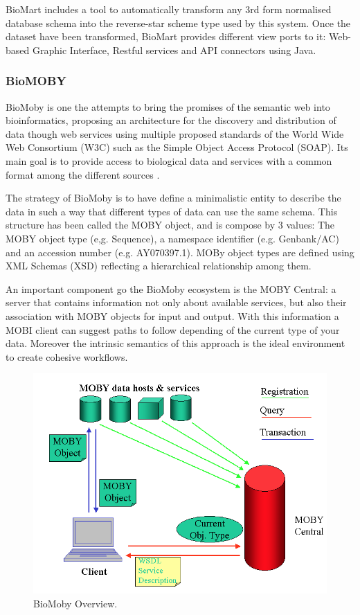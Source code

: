 BioMart includes a tool to automatically transform any 3rd form normalised database schema into the reverse-star scheme type used by this system. Once the dataset have been transformed, BioMart provides different view ports to it: Web-based Graphic Interface, Restful services and API connectors using Java.

\subsubsection{BioMOBY}
BioMoby is one the attempts to bring the promises of the semantic web into bioinformatics, proposing an architecture for the discovery and distribution of data though web services using multiple proposed standards of the World Wide Web Consortium (W3C) such as the Simple Object Access Protocol (SOAP). Its main goal is to provide access to biological data and services with a common format among the different sources \cite{WIL2002}.

The strategy of BioMoby is to have define a minimalistic entity to describe the data in such a way that different types of data can use the same schema.
This structure has been called the MOBY object, and is compose by 3 values: The MOBY object type (e,g. Sequence), a namespace identifier (e.g. Genbank/AC) and an accession number (e.g. AY070397.1). MOBy object types are defined using XML Schemas (XSD) reflecting a hierarchical relationship among them.

An important component go the BioMoby ecosystem is the MOBY Central: a server that contains information not only about available services, but also their association with MOBY objects for input and output. With this information a MOBI client can suggest paths to follow depending of the current type of your data. Moreover the intrinsic semantics of this approach is the ideal environment to create cohesive workflows.

\begin{figure}  
\includegraphics[width=\textwidth]{figures/MOBY_Overview.png}
\caption[BioMoby Overview.]{BioMoby Overview.
\label{fig:biomoby}}
\end{figure}

